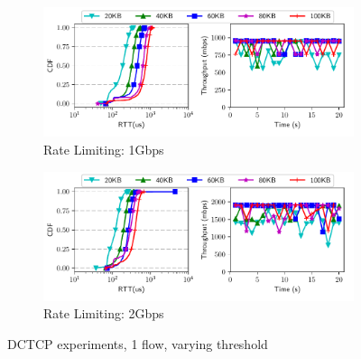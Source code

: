 \begin{figure}[!htb]
\centering

\begin{subfigure}[b]{0.9\textwidth}
\centering
\includegraphics[width=\textwidth]{rate_limiter/raw_data/dctcp_benchmark/1gbps.pdf}
\caption{Rate Limiting: 1Gbps}
\label{fig:dctcp-1g} 
\end{subfigure}
\begin{subfigure}[b]{0.9\textwidth}
\centering
\includegraphics[width=\textwidth]{rate_limiter/raw_data/dctcp_benchmark/2gbps.pdf}
\caption{Rate Limiting: 2Gbps}
\label{fig:dctcp-2g} 
\end{subfigure}
\caption{DCTCP experiments, 1 flow, varying threshold}
\label{fig:dctcp}
\end{figure}


